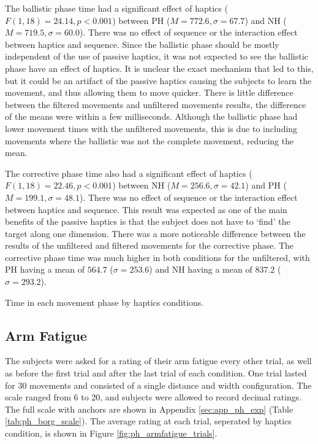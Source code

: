 The ballistic phase time had a significant effect of haptics ($F(1, 18)=24.14, p<0.001$) between PH ($M=772.6, \sigma=67.7$) and NH ($M=719.5, \sigma=60.0$).
There was no effect of sequence or the interaction effect between haptics and sequence.
Since the ballistic phase should be mostly independent of the use of passive haptics, it was not expected to see the ballistic phase have an effect of haptics.
It is unclear the exact mechanism that led to this, but it could be an artifact of the passive haptics causing the subjects to learn the movement, and thus allowing them to move quicker.
There is little difference between the filtered movements and unfiltered movements results, the difference of the means were within a few milliseconds.
Although the ballistic phase had lower movement times with the unfiltered movements, this is due to including movements where the ballistic was not the complete movement, reducing the mean.

The corrective phase time also had a significant effect of haptics ($F(1, 18)=22.46, p<0.001$) between NH ($M=256.6, \sigma=42.1$) and PH ($M=199.1, \sigma=48.1$).
There was no effect of sequence or the interaction effect between haptics and sequence.
This result was expected as one of the main benefits of the passive haptics is that the subject does not have to `find' the target along one dimension.
There was a more noticeable difference between the results of the unfiltered and filtered movements for the corrective phase.
The corrective phase time was much higher in both conditions for the unfiltered, with PH having a mean of $564.7$ ($\sigma=253.6$) and NH having a mean of $837.2$ ($\sigma=293.2$).

\begin{table}
    \centering
    \caption{Time in each movement phase by haptics conditions.}
    \label{tab:ph_phases}
\end{table}

\subsection{Arm Fatigue}

The subjects were asked for a rating of their arm fatigue every other trial, as well as before the first trial and after the last trial of each condition.
One trial lasted for 30 movements and consisted of a single distance and width configuration.
The scale ranged from 6 to 20, and subjects were allowed to record decimal ratings.
The full scale with anchors are shown in Appendix \ref{sec:app_ph_exp} (Table \ref{tab:ph_borg_scale}).
The average rating at each trial, seperated by haptics condition, is shown in Figure \ref{fig:ph_armfatigue_trials}.


